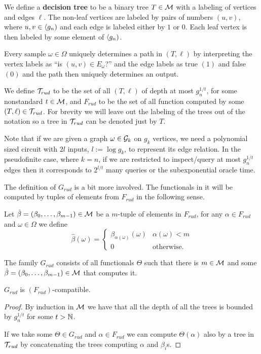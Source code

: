 \begin{defi}
We define a \textbf{decision tree} to be a binary tree $T\in\mathcal{M}$ with a labeling of vertices and edges $\ell$. The non-leaf vertices are labeled by pairs of numbers $(u,v)$, where $u,v\in\langle g_n)$ and each edge is labeled either by $1$ or $0$. Each leaf vertex is then labeled by some element of $\langle g_n)$.

Every sample $\omega\in\Omega$ uniquely determines a path in $(T,\ell)$ by interpreting the vertex labels as ``is $(u,v)\in E_\omega$?'' and the edge labels as true $(1)$ and false $(0)$ and the path then uniquely determines an output.

We define $\mathcal{T}_{rud}$ to be the set of all $(T,\ell)$ of depth at most $g_n^{1/t}$, for some nonstandard $t\in\mathcal{M}$, and $F_{rud}$ to be the set of all function computed by some $(T,\ell)\in \mathcal{T}_{rud}$. For brevity we will leave out the labeling of the trees out of the notation so a tree in $\mathcal{T}_{rud}$ can be denoted just by $T$.
\end{defi}

Note that if we are given a graph $\omega \in \mathcal{G}_k$ on $g_k$ vertices, we need a polynomial sized circuit with $2l$ inputs, $l:=\log g_k$, to represent its edge relation. In the pseudofinite case, where $k=n$, if we are restricted to inspect/query at most $g_n^{1/t}$ edges then it corresponds to $2^{l/t}$ many queries or the subexponential oracle time.

The definition of $G_{rud}$ is a bit more involved. The functionals in it will be computed by tuples of elements from $F_{rud}$ in the following sense.

\begin{defi}
Let $\hat\beta=(\beta_0,\dots,\beta_{m-1})\in\mathcal{M}$ be a $m$-tuple of elements in $F_{rud}$, for any $\alpha\in F_{rud}$ and $\omega\in\Omega$ we define
\[\hat\beta(\omega)=
\begin{cases}
\beta_{\alpha(\omega)}(\omega)&\alpha(\omega)<m\\
0&\text{otherwise.}
\end{cases}\]
\end{defi}

\begin{defi}
The family $G_{rud}$ consists of all functionals $\Theta$ such that there is $m\in\mathcal{M}$ and some $\hat \beta=(\beta_0,\dots,\beta_{m-1})\in\mathcal{M}$ that computes it.
\end{defi}

\begin{lemm}
$G_{rud}$ is $(F_{rud})$-compatible.
\end{lemm}
\begin{proof}
By induction in $\mathcal{M}$ we have that all the depth of all the trees is bounded by $g_n^{1/t}$ for some $t>\mathbb{N}$.

If we take some $\Theta\in G_{rud}$ and $\alpha\in F_{rud}$ we can compute $\Theta(\alpha)$ also by a tree in $\mathcal{T}_{rud}$ by concatenating the trees computing $\alpha$ and $\beta_i$s.
\end{proof}

